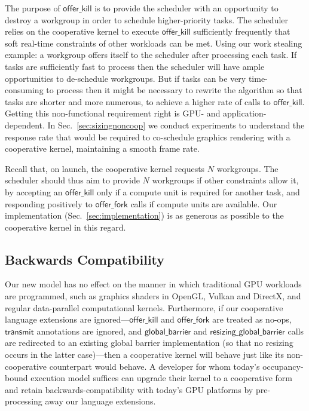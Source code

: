 \documentclass[numbers,nocopyrightspace,10pt]{sigplanconf}
\newcommand{\mysec}{Sec.~}
\newcommand{\transmit}{\mathsf{transmit}}
\newcommand{\offerfork}{\mathsf{offer\_fork}}
\newcommand{\offerkill}{\mathsf{offer\_kill}}
\newcommand{\globalbarrier}{\mathsf{global\_barrier}}
\newcommand{\resizingglobalbarrier}{\mathsf{resizing\_global\_barrier}}
\begin{document}
The purpose of $\offerkill$ is to provide the scheduler with an
opportunity to destroy a workgroup in order to schedule
higher-priority tasks.  The scheduler relies on the cooperative kernel
to execute $\offerkill$ sufficiently frequently that soft real-time
constraints of other workloads can be met.
%
Using our work stealing example: a workgroup offers itself to
the scheduler after processing each task.  If tasks are sufficiently
fast to process then the scheduler will have ample opportunities to
de-schedule workgroups.  But if tasks can be very time-consuming to
process then it might be necessary to rewrite the algorithm so that
tasks are shorter and more numerous, to achieve a higher rate of calls
to $\offerkill$.
%
Getting this non-functional requirement right is GPU- and application-dependent.
In \mysec\ref{sec:sizingnoncoop} we conduct
experiments to understand the response rate that would be required to
co-schedule graphics rendering with a cooperative kernel, maintaining a smooth frame rate.


Recall that, on launch, the cooperative kernel requests $N$ workgroups.
The scheduler should thus aim to provide $N$ workgroups if other constraints allow it,
by accepting an $\offerkill$ only if a compute unit is required for another
task, and responding positively to $\offerfork$ calls if compute units are available.  Our
implementation (\mysec\ref{sec:implementation}) is as
generous as possible to the cooperative kernel in this regard.



\subsection{Backwards Compatibility}\label{sec:backwardscompatibility}

Our new model has no effect on the manner in which traditional GPU
workloads are programmed, such as graphics shaders in OpenGL, Vulkan
and DirectX, and regular data-parallel computational kernels.
%
Furthermore, if our cooperative language extensions are
ignored---$\offerkill$ and $\offerfork$ are treated as no-ops,
$\transmit$ annotations are ignored, and $\globalbarrier$ and
$\resizingglobalbarrier$ calls are redirected to an existing global
barrier implementation (so that no resizing occurs in the latter
case)---then a cooperative kernel will behave just like its
non-cooperative counterpart would behave.  A developer
for whom today's occupancy-bound execution model suffices can upgrade
their kernel to a cooperative form and retain backwards-compatibility
with today's GPU platforms by pre-processing away our language
extensions.
\end{document}

